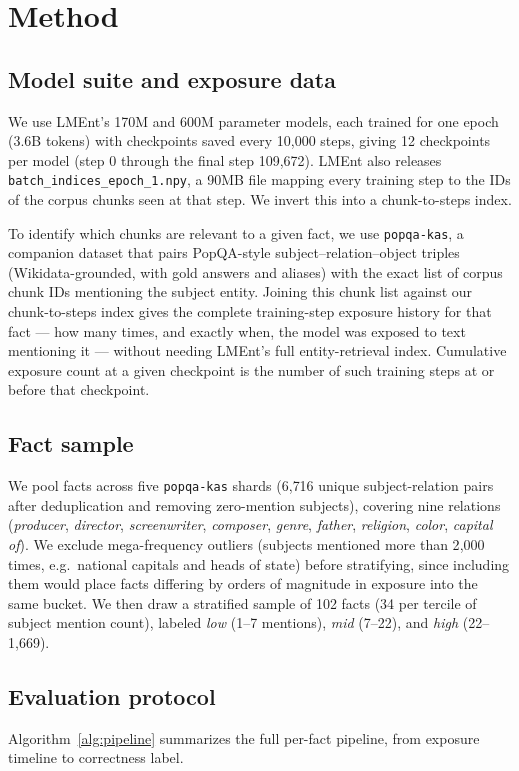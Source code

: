 \documentclass[11pt]{article}
\begin{document}
\section{Method}
\label{sec:method}

\subsection{Model suite and exposure data}
We use LMEnt's 170M and 600M parameter models, each trained for one epoch (3.6B tokens) with checkpoints saved every 10{,}000 steps, giving 12 checkpoints per model (step 0 through the final step 109{,}672). LMEnt also releases \texttt{batch\_indices\_epoch\_1.npy}, a 90MB file mapping every training step to the IDs of the corpus chunks seen at that step. We invert this into a chunk-to-steps index.

To identify which chunks are relevant to a given fact, we use \texttt{popqa-kas}, a companion dataset that pairs PopQA-style subject--relation--object triples (Wikidata-grounded, with gold answers and aliases) with the exact list of corpus chunk IDs mentioning the subject entity. Joining this chunk list against our chunk-to-steps index gives the complete training-step exposure history for that fact --- how many times, and exactly when, the model was exposed to text mentioning it --- without needing LMEnt's full entity-retrieval index. Cumulative exposure count at a given checkpoint is the number of such training steps at or before that checkpoint.

\subsection{Fact sample}
We pool facts across five \texttt{popqa-kas} shards (6{,}716 unique subject-relation pairs after deduplication and removing zero-mention subjects), covering nine relations (\textit{producer}, \textit{director}, \textit{screenwriter}, \textit{composer}, \textit{genre}, \textit{father}, \textit{religion}, \textit{color}, \textit{capital of}). We exclude mega-frequency outliers (subjects mentioned more than 2{,}000 times, e.g.\ national capitals and heads of state) before stratifying, since including them would place facts differing by orders of magnitude in exposure into the same bucket. We then draw a stratified sample of 102 facts (34 per tercile of subject mention count), labeled \textit{low} (1--7 mentions), \textit{mid} (7--22), and \textit{high} (22--1{,}669).

\subsection{Evaluation protocol}
Algorithm~\ref{alg:pipeline} summarizes the full per-fact pipeline, from exposure timeline to correctness label.
\end{document}
